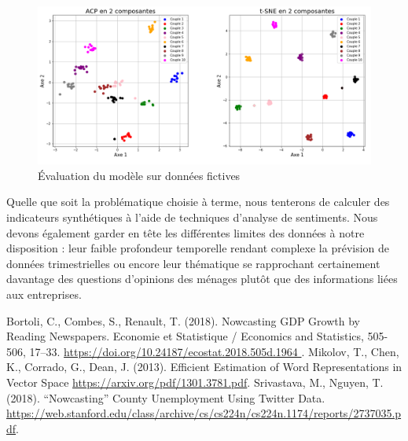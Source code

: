 \documentclass[11pt,french,french]{article}
\begin{document}
\begin{figure}
\centering
\includegraphics[width=1\textwidth]{figures.png}
\captionsetup{margin=0cm,format=hang,justification=justified}
\caption{Évaluation du modèle sur données fictives}\label{fig:figure_evaluation}
\end{figure}

Quelle que soit la problématique choisie à terme, nous tenterons de
calculer des indicateurs synthétiques à l'aide de techniques d'analyse
de sentiments. Nous devons également garder en tête les différentes
limites des données à notre disposition : leur faible profondeur
temporelle rendant complexe la prévision de données trimestrielles ou
encore leur thématique se rapprochant certainement davantage des
questions d'opinions des ménages plutôt que des informations liées aux
entreprises.

\nocite{*}

\begin{thebibliography}{999}
 Bortoli, C., Combes, S., Renault, T. (2018). Nowcasting GDP Growth by Reading Newspapers. Economie et Statistique / Economics and Statistics, 505-506, 17–33. \url{https://doi.org/10.24187/ecostat.2018.505d.1964 }.
Mikolov, T.,  Chen, K., Corrado, G., Dean, J. (2013). Efficient Estimation of Word Representations in Vector Space \url{https://arxiv.org/pdf/1301.3781.pdf}.
Srivastava, M., Nguyen, T. (2018). “Nowcasting” County Unemployment Using Twitter Data. \url{https://web.stanford.edu/class/archive/cs/cs224n/cs224n.1174/reports/2737035.pdf}.
\end{thebibliography}
\end{document}
